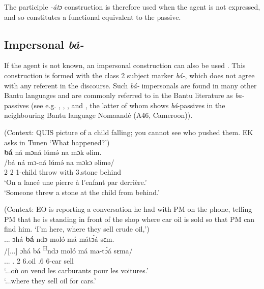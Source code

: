 \documentclass[output=paper,colorlinks,citecolor=brown
]{langscibook}
\begin{document}
The participle \textit{-átɔ} construction is therefore used when the agent is not expressed, and so constitutes a functional equivalent to the passive.

\subsection{Impersonal \textit{bá-}}
If the agent is not known, an impersonal construction can also be used \citep{Mous2008}. This construction is formed with the class 2 subject marker \textit{bá-}, which does not agree with any referent in the discourse. Such \textit{bá-} impersonals are found in many other Bantu languages and are commonly referred to in the Bantu literature as \textit{ba-}passives (see e.g. \citealt{Fleisch2005}, \cite{chapters/rukiga}, \cite{chapters/teke}, and \citealt{Taylor1999}, the latter of whom shows \textit{bá}-passives in the neighbouring Bantu
language Nomaandé (A46, Cameroon)). 

\ea
(Context: QUIS picture of a child falling; you cannot see who pushed them. EK asks in Tunen `What happened?') \\ 
\glll
{\db}\textbf{bá} ná mɔná lúmə́ na mɔk əlim. \\
/bá ná mɔ-ná lúmə́ na mɔkɔ əlimə/ \\
{\db}2\SM{} \PST{}2{} 1-child throw with 3.stone behind \\
\glt
`On a lancé une pierre à l'enfant par derrière.' \\ `Someone threw a stone at the child from behind.' \jambox*{[EO 439] }

\z

\ea
(Context: EO is reporting a conversation he had with PM on the phone, telling PM that he is standing in front of the shop where car oil is sold so that PM can find him. `I'm here, where they sell crude oil,') \\
\glll 
... ɔhá \textbf{bá} ndɔ moló má mátɔ́á sɛm. \\
/[...] ɔhá bá \textsuperscript{H}ndɔ moló má ma-tɔ́á sɛma/   \\
{\db}... \REL{}.\LOC{} 2\SM{} \PRS{} 6.oil \ASS{}.6{} 6-car sell \\
\glt
`...où on vend les carburants pour les voitures.' \\ `...where they sell oil for cars.' \jambox*{[EO 1029] }
\end{document}
